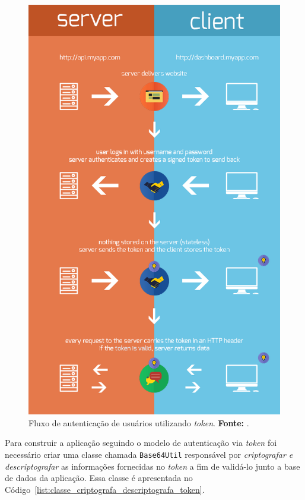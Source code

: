 \newpage
\begin{figure}[h!]
	\centerline{\includegraphics[scale=0.5]{./imagens/tokens-new.png}}
	\caption[Fluxo de autenticação de usuários utilizando \textit{token}]
	{Fluxo de autenticação de usuários utilizando \textit{token}. \textbf{Fonte:} \cite{authentication_via_token_chris_sevilleja}.}
	\label{fig:autenticacao_via_token}
\end{figure}

Para construir a aplicação seguindo o modelo de autenticação via \textit{token} foi necessário criar uma classe chamada \texttt{Base64Util} responsável por \textit{criptografar e descriptografar} as informações fornecidas no \textit{token} a fim de validá-lo junto a base de dados da aplicação. Essa classe é apresentada no Código~\ref{list:classe_criptografa_descriptografa_token}.

